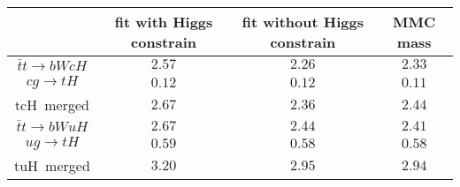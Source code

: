 
\centering
\begin{tabular}{cccc} \toprule\toprule
& fit with Higgs constrain  & fit without Higgs constrain & MMC mass\\\midrule
$\bar{t}t\to bWcH$ &    $2.57$  & $2.26$  & $2.33$       \\
$cg\to tH$ &            $0.12$  & $0.12$  & $0.11$       \\
tcH~merged &            $2.67$  & $2.36$  & $2.44$        \\
$\bar{t}t\to bWuH$ &    $2.67$  & $2.44$  & $2.41$         \\
$ug\to tH$ &            $0.59$  & $0.58$  & $0.58$         \\
tuH~merged &            $3.20$  & $2.95$  & $2.94$         \\
\bottomrule\bottomrule                  
\end{tabular}
